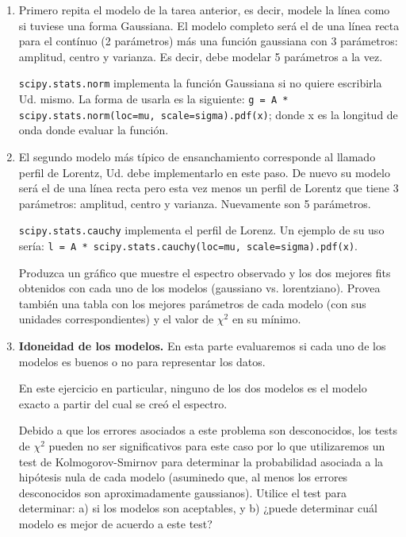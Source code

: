 \documentclass[letter, 11pt]{article}
\begin{document}
\renewcommand{\labelenumi}{(\arabic{enumi})}
\begin{enumerate}

\item Primero repita el modelo de la tarea anterior, es decir, modele la línea
  como si tuviese una forma Gaussiana. El modelo completo será el de una línea
  recta para el contínuo (2 parámetros) más una función gaussiana con 3
  parámetros: amplitud, centro y varianza. Es decir, debe modelar 5 parámetros
  a la vez.

  \begin{ayuda}
    \texttt{scipy.stats.norm} implementa la función Gaussiana si no quiere
    escribirla Ud. mismo. La forma de usarla es la siguiente: \texttt{g = A *
    scipy.stats.norm(loc=mu, scale=sigma).pdf(x)}; donde x es la longitud de
    onda donde evaluar la función.
  \end{ayuda}

\item El segundo modelo más típico de ensanchamiento corresponde al llamado
  perfil de Lorentz, Ud. debe implementarlo en este paso. De nuevo su modelo
  será el de una línea recta pero esta vez menos un perfil de Lorentz que tiene
  3 parámetros: amplitud, centro y varianza.  Nuevamente son 5 parámetros.

  \begin{ayuda}
    \texttt{scipy.stats.cauchy} implementa el perfil de Lorenz. Un ejemplo de
    su uso sería: \texttt{l = A * scipy.stats.cauchy(loc=mu,
    scale=sigma).pdf(x)}.
  \end{ayuda}

  Produzca un gráfico que muestre el espectro observado y los dos mejores fits
  obtenidos con cada uno de los modelos (gaussiano vs. lorentziano). Provea
  también una tabla con los mejores parámetros de cada modelo (con sus unidades
  correspondientes) y el valor de $\chi^2$ en su mínimo.

\item {\bf Idoneidad de los modelos.} En esta parte evaluaremos si cada uno de
  los modelos es buenos o no para representar los datos.

  \begin{ayuda}
    \small
    En este ejercicio en particular, ninguno de los dos modelos es el modelo
    exacto a partir del cual se creó el espectro.
  \end{ayuda}

  Debido a que los errores asociados a este problema son desconocidos, los
  tests de $\chi^2$ pueden no ser significativos para este caso por lo que
  utilizaremos un test de Kolmogorov-Smirnov para determinar la probabilidad
  asociada a la hipótesis nula de cada modelo (asuminedo que, al menos los
  errores desconocidos son aproximadamente gaussianos). Utilice el test para
  determinar: a) si los modelos son aceptables, y b) ¿puede determinar cuál
  modelo es mejor de acuerdo a este test?

\end{enumerate}
\end{document}
